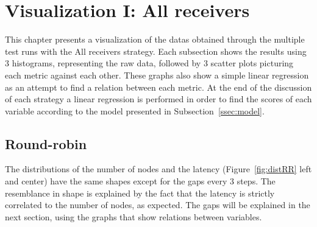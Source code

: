 
\begin{table}[H]
\end{table}


\section{Visualization I: All receivers}
This chapter presents a visualization of the datas obtained through the multiple
test runs with the All receivers strategy.  Each subsection shows the results
using 3 histograms, representing the raw data, followed by 3 scatter plots
picturing each metric against each other. These graphs also show a simple linear
regression as an attempt to find a relation between each metric. At the end of
the discussion of each strategy a linear regression is performed in order to
find the scores of each variable according to the model presented in
Subsection~\ref{ssec:model}.



\subsection{Round-robin}

The distributions of the number of nodes and the latency
(Figure~\ref{fig:distRR} left and center) have the same
shapes except for the gaps every 3 steps. The resemblance in shape is explained
by the fact that the latency is strictly correlated to the number of nodes, as
expected.
The gaps will be explained in the next section, using the graphs that show
relations between variables. 

